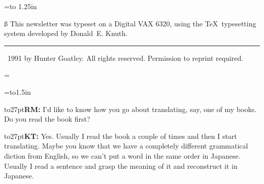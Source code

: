 =\vbox to 1.25in{\hsize=125pt%
	\vfil\noindent\eightpoint\ss\leftskip=6pt
	This newsletter was typeset on a Digital VAX 6320, using the \TeX\
	typesetting system developed by Donald~E. Knuth.
	\par
	\vfil \hrule \vfil
	\noindent\smallcopyright\ 1991 by Hunter Goatley.  All rights reserved.
	Permission to reprint required.\par
	\vfil}


\setbox\edboxone=\vbox{\hbox{\vrule{}\vrule{}\vrule{}}}

\setbox\edboxone=\vbox to1.5in{
	\boxitspace=6pt
	\vfill
	\boxit{\unvbox\edboxone}
	\vfill
	}

\box\edboxone

\eject					%

%
%
%
%




%
%
\def\RM:{\vskip6pt\noindent\hbox to27pt{\bf RM:\hfil}}
\def\KT:{\vskip6pt\noindent\hbox to27pt{\bf KT:\hfil}}



\RM:  I'd like to know how you go about translating, say, one of my books.
Do you read the book first?

\KT: Yes.  Usually I read the book a couple of times and then I start
translating.  Maybe you know that we have a completely different grammatical
diction from English, so we can't put a word in the same order in Japanese.
Usually I read a sentence and grasp the meaning of it and reconstruct it in
Japanese.

